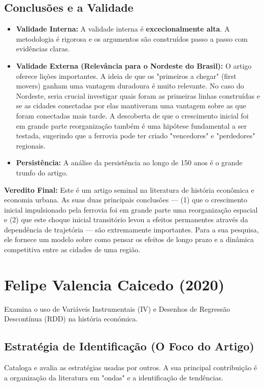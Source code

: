 \documentclass[12pt, a4paper]{article}
\begin{document}
\subsection{Conclusões e a Validade}
\begin{itemize}
    \item \textbf{Validade Interna:} A validade interna é \textbf{excecionalmente alta}. A metodologia é rigorosa e os argumentos são construídos passo a passo com evidências claras.
    \item \textbf{Validade Externa (Relevância para o Nordeste do Brasil):} O artigo oferece lições importantes. A ideia de que os "primeiros a chegar" (first movers) ganham uma vantagem duradoura é muito relevante. No caso do Nordeste, seria crucial investigar quais foram as primeiras linhas construídas e se as cidades conectadas por elas mantiveram uma vantagem sobre as que foram conectadas mais tarde. A descoberta de que o crescimento inicial foi em grande parte reorganização também é uma hipótese fundamental a ser testada, sugerindo que a ferrovia pode ter criado "vencedores" e "perdedores" regionais.
    \item \textbf{Persistência:} A análise da persistência ao longo de 150 anos é o grande trunfo do artigo.
\end{itemize}

\noindent\textbf{Veredito Final:} Este é um artigo seminal na literatura de história econômica e economia urbana. As suas duas principais conclusões — (1) que o crescimento inicial impulsionado pela ferrovia foi em grande parte uma reorganização espacial e (2) que este choque inicial transitório levou a efeitos permanentes através da dependência de trajetória — são extremamente importantes. Para a sua pesquisa, ele fornece um modelo sobre como pensar os efeitos de longo prazo e a dinâmica competitiva entre as cidades de uma região.

\section{Felipe Valencia Caicedo (2020)}
Examina o uso de Variáveis Instrumentais (IV) e Desenhos de Regressão Descontínua (RDD) na história económica. 

\subsection{Estratégia de Identificação (O Foco do Artigo)}
Cataloga e avalia as estratégias usadas por outros. A sua principal contribuição é a organização da literatura em "ondas" e a identificação de tendências.
\end{document}
